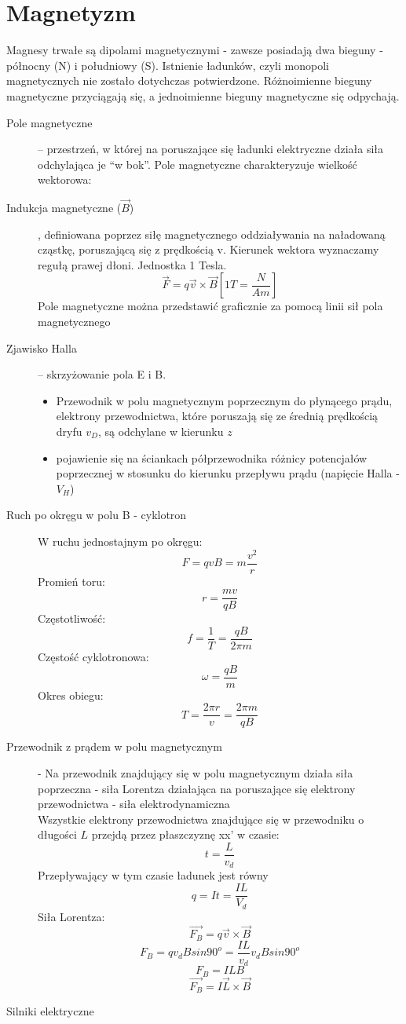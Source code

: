 \documentclass[a4paper,11pt]{article}
\begin{document}
\section{Magnetyzm}
Magnesy trwałe są dipolami magnetycznymi - zawsze posiadają dwa bieguny - północny (N) i południowy (S). Istnienie ładunków, czyli monopoli magnetycznych nie zostało dotychczas potwierdzone. Różnoimienne bieguny magnetyczne przyciągają się, a jednoimienne bieguny magnetyczne się odpychają.
\begin{description}
\item[Pole magnetyczne] -- przestrzeń, w której na poruszające się ładunki elektryczne działa siła odchylająca je ``w bok''. Pole magnetyczne charakteryzuje wielkość wektorowa:
\item[Indukcja magnetyczne ($\vec{B}$)], definiowana poprzez siłę magnetycznego oddziaływania na naładowaną cząstkę, poruszającą się z prędkością v. Kierunek wektora wyznaczamy regułą prawej dłoni. Jednostka 1 Tesla.
  $$\vec{F} = q\vec{v}\times\vec{B}\left[1T = \frac{N}{Am}\right]$$
  Pole magnetyczne można przedstawić graficznie za pomocą linii sił pola magnetycznego
\item[Zjawisko Halla] -- skrzyżowanie pola E i B. 
  \begin{itemize}
  \item Przewodnik w polu magnetycznym poprzecznym do płynącego prądu, elektrony przewodnictwa, które poruszają się ze średnią prędkością dryfu $v_D$, są odchylane w kierunku $z$
  \item pojawienie się na ściankach półprzewodnika różnicy potencjałów poprzecznej w stosunku do kierunku przepływu prądu (napięcie Halla - $V_H$)
  \end{itemize}
\item[Ruch po okręgu w polu B - cyklotron]
  W ruchu jednostajnym po okręgu:
  $$F=qvB=m\frac{v^2}{r}$$
  Promień toru: 
  $$r=\frac{mv}{qB}$$
  Częstotliwość:
  $$f = \frac{1}{T}=\frac{qB}{2\pi m}$$
  Częstość cyklotronowa:
  $$\omega = \frac{qB}{m}$$
  Okres obiegu:
  $$T=\frac{2\pi r}{v}=\frac{2\pi m}{qB}$$
\item[Przewodnik z prądem w polu magnetycznym] - Na przewodnik znajdujący się w polu magnetycznym działa siła poprzeczna - siła Lorentza działająca na poruszające się elektrony przewodnictwa - siła elektrodynamiczna\\
  Wszystkie elektrony przewodnictwa znajdujące się w przewodniku o długości $L$ przejdą przez płaszczyznę xx' w czasie:
  $$t=\frac{L}{v_d}$$
  Przepływający w tym czasie ładunek jest równy $$q=It=\frac{IL}{V_d}$$
  Siła Lorentza:
  $$\vec{F_B}=q\vec{v}\times\vec{B}$$
  $$F_B = qv_dBsin90^o=\frac{IL}{v_d}v_dBsin90^o$$
  $$F_B=ILB$$
  $$\vec{F_B}=I\vec{L}\times\vec{B}$$
\item[Silniki elektryczne]


\end{description}
\end{document}
